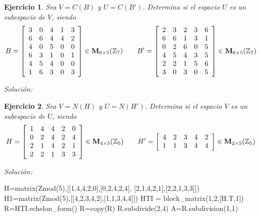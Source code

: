 \documentclass{amsart}
\newtheorem{ejer}{Ejercicio}
\begin{document}
\begin{ejer} Sea $V = C(B)$ y $U = C(B')$. Determina si el espacio $U$ es un 
subespacio de $V$, siendo 
\[B = \left[\begin{array}{rrrrr}
3 & 0 & 4 & 1 & 3 \\
6 & 6 & 4 & 4 & 2 \\
4 & 0 & 5 & 0 & 0 \\
6 & 3 & 1 & 0 & 1 \\
4 & 5 & 4 & 0 & 0 \\
1 & 6 & 3 & 0 & 3
\end{array}\right] \in {\bf M}_{6 \times 5}({\mathbb Z}_{7}) \qquad
B' = \left[\begin{array}{rrrrr}
2 & 3 & 2 & 3 & 6 \\
6 & 6 & 1 & 3 & 1 \\
0 & 2 & 6 & 0 & 5 \\
4 & 5 & 4 & 3 & 5 \\
2 & 2 & 1 & 5 & 6 \\
3 & 0 & 3 & 0 & 5
\end{array}\right] \in {\bf M}_{6 \times 5}({\mathbb Z}_{7}) \]
\end{ejer}

{\it Soluci\'on:}




\begin{ejer} Sea $V = N(H)$ y $U = N(H')$. Determina si el espacio $V$ es un subespacio de $U$, siendo 
\[H = \left[\begin{array}{rrrrr}
1 & 4 & 4 & 2 & 0 \\
0 & 2 & 4 & 2 & 4 \\
2 & 1 & 4 & 2 & 1 \\
2 & 2 & 1 & 3 & 3
\end{array}\right] \in {\bf M}_{4 \times 5}({\mathbb Z}_{5}) \qquad
H' = \left[\begin{array}{rrrrr}
4 & 2 & 3 & 4 & 2 \\
1 & 1 & 3 & 4 & 4 
\end{array}\right] \in {\bf M}_{2 \times 5}({\mathbb Z}_{5}) \]
\end{ejer}

{\it Soluci\'on:}
\begin{sageblock}
H=matrix(Zmod(5),[[1,4,4,2,0],[0,2,4,2,4],
[2,1,4,2,1],[2,2,1,3,3]])
H1=matrix(Zmod(5),[[4,2,3,4,2],[1,1,3,4,4]])
HTI = block_matrix(1,2,[H.T,1])
R=HTI.echelon_form()
R=copy(R)
R.subdivide(2,4)
A=R.subdivision(1,1)
\end{sageblock}
\end{document}
